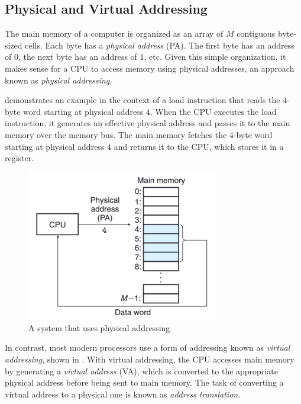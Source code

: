 \documentclass[../ch4.tex, ../../main.tex]{subfiles}
\begin{document}
    \subsection{Physical and Virtual Addressing}

        The main memory of a computer is organized as an array of $M$ contiguous byte-sized cells. Each byte has a \textit{physical address} (PA). The first byte has an address of $0$, the next byte has an address of $1$, etc. Given this simple organization, it makes sense for a CPU to access memory using physical addresses, an approach known as \textit{physical addressing}.

         demonstrates an example in the context of a load instruction that reads the $4$-byte word starting at physical address $4$. When the CPU executes the load instruction, it generates an effective physical address and passes it to the main memory over the memory bus. The main memory fetches the $4$-byte word starting at physical address $4$ and returns it to the CPU, which stores it in a register.

        \begin{figure}[H]
            \centering
            \includegraphics[width=0.75\textwidth]{graphics/Figure 4.1.png}
            \caption{A system that uses physical addressing}
            \label{fig:41}
        \end{figure}

        In contrast, most modern processors use a form of addressing known as \textit{virtual addressing}, shown in . With virtual addressing, the CPU accesses main memory by generating a \textit{virtual address} (VA), which is converted to the appropriate physical address before being sent to main memory. The task of converting a virtual address to a physical one is known as \textit{address translation}.
\end{document}
